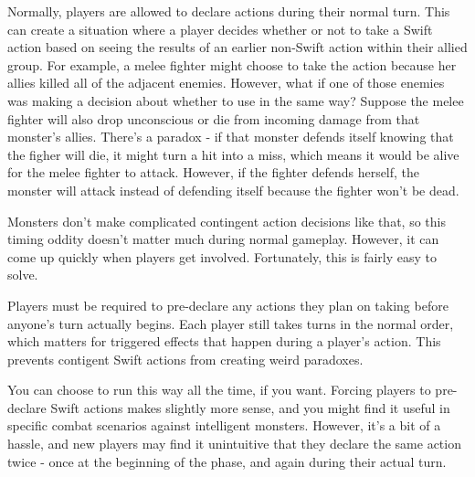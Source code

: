     Normally, players are allowed to declare  actions during their normal turn.
    This can create a situation where a player decides whether or not to take a Swift action based on seeing the results of an earlier non-Swift action within their allied group.
    For example, a melee fighter might choose to take the  action because her allies killed all of the adjacent enemies.
    However, what if one of those enemies was making a decision about whether to use  in the same way?
    Suppose the melee fighter will also drop unconscious or die from incoming damage from that monster's allies.
    There's a paradox - if that monster defends itself knowing that the figher will die, it might turn a hit into a miss, which means it would be alive for the melee fighter to attack.
    However, if the fighter defends herself, the monster will attack instead of defending itself because the fighter won't be dead.

    Monsters don't make complicated contingent action decisions like that, so this timing oddity doesn't matter much during normal gameplay.
    However, it can come up quickly when players get involved.
    Fortunately, this is fairly easy to solve.

    Players must be required to pre-declare any  actions they plan on taking before anyone's turn actually begins.
    Each player still takes turns in the normal order, which matters for triggered effects that happen during a player's action.
    This prevents contigent Swift actions from creating weird paradoxes.

    You can choose to run this way all the time, if you want.
    Forcing players to pre-declare Swift actions makes slightly more sense, and you might find it useful in specific combat scenarios against intelligent monsters.
    However, it's a bit of a hassle, and new players may find it unintuitive that they declare the same action twice - once at the beginning of the phase, and again during their actual turn.
